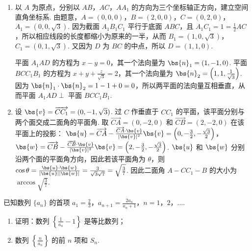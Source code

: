 \begin{solution}
\begin{enumerate}
\item 以 \(A\) 为原点，分别以 \(AB\)，\(AC\)，\(AA_{1}\) 的方向为三个坐标轴正方向，建立空间直角坐标系. 由题意，\(A=(0,0,0)\)，\(B=(2,0,0)\)，\(C=(0,2,0)\)，\(A_{1}=(0,0,\sqrt{3})\). 因为截面 \(A_{1}B_{1}C_{1}\) 平行于底面 \(ABC\)，且 \(A_{1}C_{1}=1=\frac{1}{2}AC\)，所以相应线段的长度都缩小为原来的一半，从而 \(B_{1}=(1,0,\sqrt{3})\)，\(C_{1}=(0,1,\sqrt{3})\). 又因为 \(D\) 为 \(BC\) 的中点，所以 \(D=(1,1,0)\).

平面 \(A_{1}AD\) 的方程为 \(x-y=0\)，其一个法向量为 \(\bs{n}_{1}=(1,-1,0)\). 平面 \(BCC_{1}B_{1}\) 的方程为 \(x+y+\frac{z}{\sqrt{3}}=2\)，其一个法向量为 \(\bs{n}_{2}=\left(1,1,\frac{1}{\sqrt{3}}\right)\). 因为 \(\bs{n}_{1}\cdot\bs{n}_{2}=1-1+0=0\)，所以两平面的法向量互相垂直，从而平面 \(A_{1}AD\perp\) 平面 \(BCC_{1}B_{1}\).
\item 设 \(\bs{v}=\overrightarrow{CC_{1}}=(0,-1,\sqrt{3})\). 过 \(C\) 作垂直于 \(CC_{1}\) 的平面，该平面分别与两个面交成二面角的平面角. 取 \(\overrightarrow{CA}=(0,-2,0)\) 和 \(\overrightarrow{CB}=(2,-2,0)\) 在该平面上的投影：
\(\bs{u}=\overrightarrow{CA}-\frac{\overrightarrow{CA}\cdot\bs{v}}{|\bs{v}|^{2}}\bs{v}=\left(0,-\frac{3}{2},-\frac{\sqrt{3}}{2}\right)\)，
\(\bs{w}=\overrightarrow{CB}-\frac{\overrightarrow{CB}\cdot\bs{v}}{|\bs{v}|^{2}}\bs{v}=\left(2,-\frac{3}{2},-\frac{\sqrt{3}}{2}\right)\).
\(\bs{u}\) 和 \(\bs{w}\) 分别沿两个面的平面角方向，因此若该平面角为 \(\theta\)，则
\(\cos\theta=\frac{\bs{u}\cdot\bs{w}}{|\bs{u}||\bs{w}|}=\frac{3}{\sqrt{3}\sqrt{7}}=\sqrt{\frac{3}{7}}\). 因此二面角 \(A-CC_{1}-B\) 的大小为 \(\arccos\sqrt{\frac{3}{7}}\).
\end{enumerate}
\end{solution}

\begin{problem}
已知数列 \(\{a_{n}\}\) 的首项 \(a_1 = \frac{2}{3}\)，\(a_{n + 1} = \frac{2a_n}{a_n + 1}\)，\(n = 1\)，\(2\)，\(\dots\).
\begin{enumerate}
\item 证明：数列 \( \left\{\frac{1}{a_{n}}-1\right\} \) 是等比数列；
\item 数列 \( \left\{\frac{n}{a_{n}}\right\} \) 的前 \(n\) 项和 \( S_{n} \).
\end{enumerate}
\end{problem}

